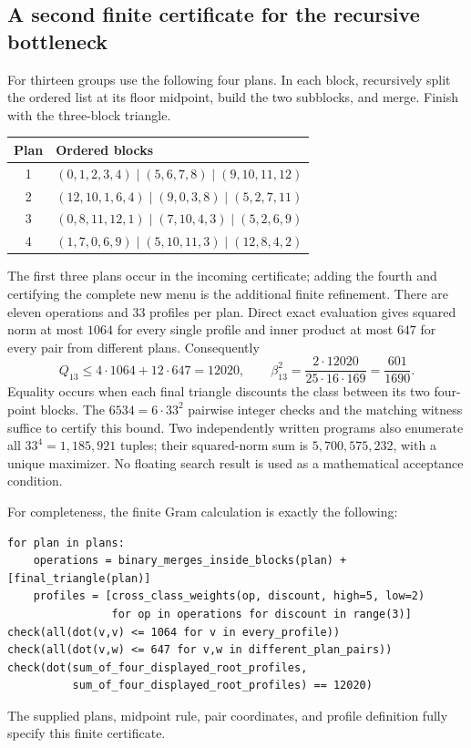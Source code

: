 \subsection{A second finite certificate for the recursive bottleneck}
For thirteen groups use the following four plans. In each block, recursively
split the ordered list at its floor midpoint, build the two subblocks, and
merge. Finish with the three-block triangle.
\begin{center}\small
\begin{tabular}{cl}
\toprule Plan & Ordered blocks\\\midrule
1 & $(0,1,2,3,4)\mid(5,6,7,8)\mid(9,10,11,12)$\\
2 & $(12,10,1,6,4)\mid(9,0,3,8)\mid(5,2,7,11)$\\
3 & $(0,8,11,12,1)\mid(7,10,4,3)\mid(5,2,6,9)$\\
4 & $(1,7,0,6,9)\mid(5,10,11,3)\mid(12,8,4,2)$\\
\bottomrule
\end{tabular}\end{center}
The first three plans occur in the incoming certificate; adding the fourth
and certifying the complete new menu is the additional finite refinement.
There are eleven operations and $33$ profiles per plan. Direct exact
evaluation gives squared norm at most $1064$ for every single profile
and inner product at most $647$ for every pair from different plans.
Consequently
\[
 Q_{13}\le4\cdot1064+12\cdot647=12020,
 \qquad \beta_{13}^2=\frac{2\cdot12020}{25\cdot16\cdot169}
 =\frac{601}{1690}.
\]
Equality occurs when each final triangle discounts the class between its
two four-point blocks. The $6534=6\cdot33^2$ pairwise integer checks
and the matching witness suffice to certify this bound. Two independently
written programs also enumerate all $33^4=1{,}185{,}921$ tuples;
their squared-norm sum is $5{,}700{,}575{,}232$, with a unique maximizer.
No floating search result is used as a mathematical acceptance condition.

For completeness, the finite Gram calculation is exactly the following:
\begin{lstlisting}
for plan in plans:
    operations = binary_merges_inside_blocks(plan) + [final_triangle(plan)]
    profiles = [cross_class_weights(op, discount, high=5, low=2)
                for op in operations for discount in range(3)]
check(all(dot(v,v) <= 1064 for v in every_profile))
check(all(dot(v,w) <= 647 for v,w in different_plan_pairs))
check(dot(sum_of_four_displayed_root_profiles,
          sum_of_four_displayed_root_profiles) == 12020)
\end{lstlisting}
The supplied plans, midpoint rule, pair coordinates, and profile definition
fully specify this finite certificate.

